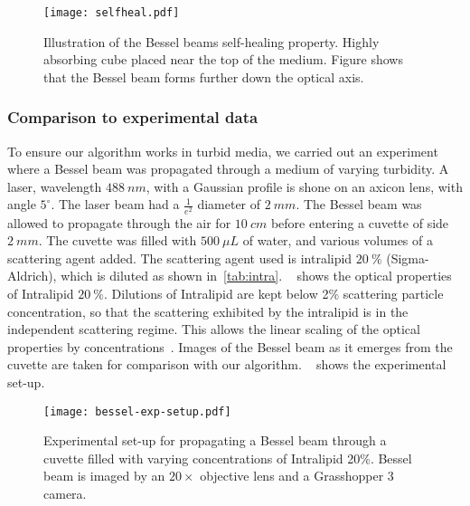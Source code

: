\begin{figure}[!htbp]
\centering
\texttt{[image: selfheal.pdf]}
\caption{Illustration of the Bessel beams self-healing property. Highly absorbing cube placed near the top of the medium. Figure shows that the Bessel beam forms further down the optical axis.}
\label{fig:selfheal}
\end{figure}

\FloatBarrier

\subsubsection*{Comparison to experimental data}

To ensure our algorithm works in turbid media, we carried out an experiment where a Bessel beam was propagated through a medium of varying turbidity.
A laser, wavelength $488~nm$, with a Gaussian profile is shone on an axicon lens, with angle $5^{\circ}$.
The laser beam had a $\tfrac{1}{e^2}$ diameter of $2~mm$. 
The Bessel beam was allowed to propagate through the air for $10~cm$ before entering a cuvette of side $2~mm$.
The cuvette was filled with $500~\mu L$ of water, and various volumes of a scattering agent added.
The scattering agent used is intralipid $20~\%$ (Sigma-Aldrich), which is diluted as shown in~\cref{tab:intra}.
~ shows the optical properties of Intralipid $20~\%$.
Dilutions of Intralipid are kept below 2\% scattering particle concentration, so that the scattering exhibited by the intralipid is in the independent scattering regime.
This allows the linear scaling of the optical properties by concentrations~\cite{aernouts2013supercontinuum,vardaki2015studying,di2011effect}.
Images of the Bessel beam as it emerges from the cuvette are taken for comparison with our algorithm.
~ shows the experimental set-up.

\begin{figure}[ht!]
    \centering
    \texttt{[image: bessel-exp-setup.pdf]}
    \caption{Experimental set-up for propagating a Bessel beam through a cuvette filled with varying concentrations of Intralipid 20\%. Bessel beam is imaged by an $20\times$ objective lens and a Grasshopper 3 camera.}
    \label{fig:expsetup}
\end{figure}


